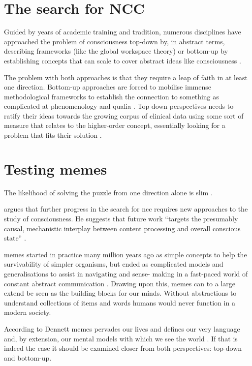 \documentclass[a4paper,oneside]{memoir}
\begin{document}
\section{The search for NCC}
Guided by years of academic training and tradition, numerous disciplines
have approached the problem of consciousness \gls{top-down} by, in abstract
terms, describing frameworks (like the global workspace theory) 
or \gls{bottom-up} by establishing concepts that can scale to cover abstract
ideas like consciousness \autocite{sep-consciousness}.

The problem with both approaches is that they require a leap of faith in at
least one direction. Bottom-up approaches are forced to mobilise immense methodological
frameworks to establish the connection to something as complicated at phenomenology
and qualia \autocite{sep-consciousness}. Top-down perspectives needs to ratify their
ideas towards the growing corpus of clinical data using some sort of measure that relates
to the higher-order concept, essentially looking for a problem that fits their solution
\autocite{sep-consciousness}.

\section{Testing memes}
The likelihood of solving the puzzle from one direction alone is slim
\autocite{sep-consciousness, Hohwy2009}.

\textcite{Hohwy2009} argues that further progress in the search for \gls{ncc} requires
new approaches to the study of consciousness. He suggests that future work
``targets the presumably causal, mechanistic interplay between content processing and
overall conscious state'' \autocite[p. 436]{Hohwy2009}.

\Gls{meme}s started in practice many million years ago as simple concepts to help the survivability of simpler
organisms, but ended as complicated models and generalisations to assist in navigating and sense-
making in a fast-paced world of constant abstract communication \autocite{dennett2017}.
Drawing upon this, memes can to a large extend be seen as the building blocks for our minds.
Without abstractions to understand collections of items and words humans would never
function in a modern society. 

According to Dennett \gls{meme}s pervades our lives and defines our very language and,
by extension, our mental models with which we see the world \autocite{dennett2017}. If
that is indeed the case it should be examined closer from both perspectives: \gls{top-down} and
\gls{bottom-up}.
\end{document}
